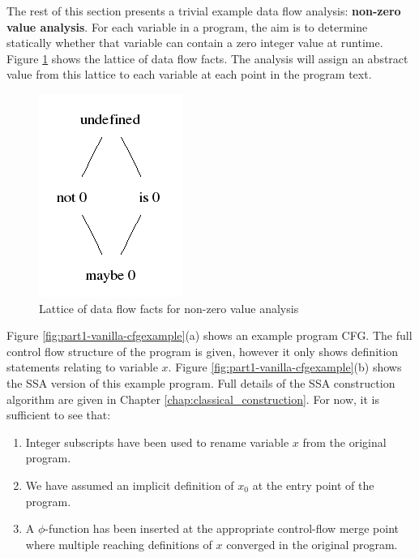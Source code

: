 The rest of this section presents a trivial example
data flow analysis: 
\textbf{non-zero value analysis}. 
For each variable in a program, the aim is to determine statically whether
that variable can contain a zero integer value at runtime.
Figure \ref{fig:part1-vanilla-nonzerolattice} shows the lattice of 
data flow facts. The analysis will assign an abstract value from this lattice
to each variable at each point in the program text.

\begin{figure}
\begin{center}
\includegraphics[scale=0.6]{zero_lattice.png}
\end{center}
\caption{\label{fig:part1-vanilla-nonzerolattice}Lattice of data flow facts
  for non-zero value analysis}
\end{figure}

Figure \ref{fig:part1-vanilla-cfgexample}(a) shows an example program CFG.
The full control flow structure of the program is given, however
it only shows definition
statements relating to variable $x$.
Figure \ref{fig:part1-vanilla-cfgexample}(b) shows the SSA version of this
example program. Full details of the SSA construction algorithm are given in 
Chapter \ref{chap:classical_construction}. For now, it is sufficient to see that:
\begin{enumerate}
\item Integer subscripts have been used to rename
variable $x$ from the original program.
\item We have assumed an implicit definition of $x_0$ at the entry point of
  the program.
\item A $\phi$-function has been
inserted at the appropriate control-flow merge point where multiple reaching
definitions of $x$ converged in the original program.
\end{enumerate}


